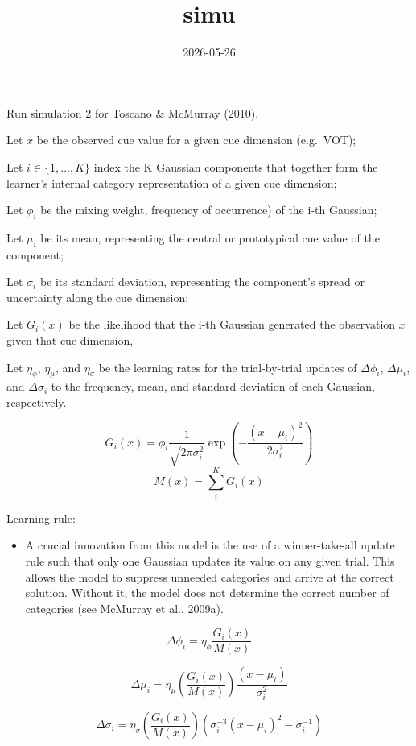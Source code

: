 \documentclass[
]{article}
\title{simu}
\author{}
\date{\vspace{-2.5em}2026-05-26}
\providecommand{\tightlist}{%
  \setlength{\itemsep}{0pt}\setlength{\parskip}{0pt}}
\begin{document}
\maketitle

Run simulation 2 for Toscano \& McMurray (2010).

Let \(x\) be the observed cue value for a given cue dimension
(e.g.~VOT);

Let \(i \in \{1, \dots, K\}\) index the K Gaussian components that
together form the learner's internal category representation of a given
cue dimension;

Let \(\phi_i\) be the mixing weight, frequency of occurrence) of the
i-th Gaussian;

Let \(\mu_i\) be its mean, representing the central or prototypical cue
value of the component;

Let \(\sigma_i\) be its standard deviation, representing the component's
spread or uncertainty along the cue dimension;

Let \(G_i(x)\) be the likelihood that the i-th Gaussian generated the
observation \(x\) given that cue dimension,

Let \(\eta_\phi\), \(\eta_\mu\), and \(\eta_\sigma\) be the learning
rates for the trial-by-trial updates of \(\Delta\phi_i\),
\(\Delta\mu_i\), and \(\Delta\sigma_i\) to the frequency, mean, and
standard deviation of each Gaussian, respectively.

\[G_i(x) = \phi_i \frac{1}{\sqrt{2\pi\sigma_i^2}} \exp\left(-\frac{(x-\mu_i)^2}{2\sigma_i^2}\right) \tag{4} \]
\[ M(x) = \sum_{i}^{K} G_i(x)  \tag{5} \]

Learning rule:

\begin{itemize}
\tightlist
\item
  A crucial innovation from this model is the use of a winner-take-all
  update rule such that only one Gaussian updates its value on any given
  trial. This allows the model to suppress unneeded categories and
  arrive at the correct solution. Without it, the model does not
  determine the correct number of categories (see McMurray et al.,
  2009a).
\end{itemize}

\[\Delta\phi_i = \eta_\phi \frac{G_i(x)}{M(x)} \tag{A2} \]

\[\Delta\mu_i = \eta_\mu \left(\frac{G_i(x)}{M(x)}\right) \frac{(x-\mu_i)}{\sigma_i^2} \tag{A3} \]

\[\Delta\sigma_i = \eta_\sigma \left(\frac{G_i(x)}{M(x)}\right) \left(\sigma_i^{-3}(x-\mu_i)^2 - \sigma_i^{-1}\right) \tag{A4} \]
\end{document}

